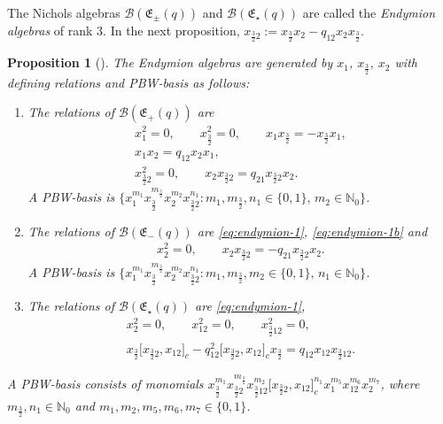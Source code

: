 \documentclass[10pt,a4paper]{amsart}
\numberwithin{equation}{section}
\newtheorem{Proposition}[Theorem]{Proposition}
 { \theoremstyle{definition}
\newtheorem{Definition}[Theorem]{Definition}
\newtheorem{Note}[Theorem]{Note}
\newtheorem{Example}[Theorem]{Example}
\newtheorem{Remark}[Theorem]{Remark} }
\newcommand{\toba}{\mathscr B}
\newcommand{\N}{{\mathbb N}}
\newcommand{\eny}{\mathfrak{E}}
\newcommand{\tresdos}{\frac{3}{2}}
\begin{document}
The Nichols algebras $\toba(\eny_{\pm}(q))$ and $\toba(\eny_{\star}(q))$ are called the \emph{Endymion algebras} of rank 3.
In the next proposition, $x_{\tresdos2} := x_{\tresdos}x_2 - q _{12} x_2x_{\tresdos}$.

\begin{Proposition}[{\cite[Propositions 8.1.6, 8.1.7 and 8.1.8]{AAH-triang}}]\label{prop:paleblocks}
The Endymion algebras are generated by $x_1$, $x_{\tresdos}$, $x_2$ with defining relations and PBW-basis as follows:
\begin{enumerate}[label=$(\alph*)$]\itemsep=0pt
\item The relations of $\toba(\eny_+(q))$ are
\begin{gather}\label{eq:endymion-1}
x_1^2=0, \qquad x_{\tresdos}^2=0,\qquad x_1x_{\tresdos} =- x_{\tresdos}x_1,
\\
\label{eq:endymion-1b}
x_1x_2 = q_{12} x_2x_1,
\\
\label{eq:endymion-2}
x_{\tresdos2}^2=0,\qquad
 x_2x_{\tresdos2} = q_{21}x_{\tresdos2} x_2.
\end{gather}
A PBW-basis is
$\big\{ x_1^{m_1} x_{\tresdos}^{m_{\tresdos}} x_2^{m_2}x_{\tresdos2}^{n_{1}}\colon m_1, m_{\tresdos}, n_1 \in \{0,1\}, \, m_2 \in\N_0\big\}$.

\item
The relations of $\toba(\eny_-(q))$ are \eqref{eq:endymion-1}, \eqref{eq:endymion-1b} and
\begin{gather}
\label{eq:endymion-2b}
x_2 ^2=0,\qquad
x_2 x_{\tresdos2} = -q_{21} x_{\tresdos2} x_2.
\end{gather}
A PBW-basis is
$\big\{ x_1^{m_1} x_{\tresdos}^{m_{\tresdos}} x_2^{m_2}x_{\tresdos2}^{n_{1}}\colon m_1, m_{\tresdos}, m_2 \in \{0,1\}, \, n_{1} \in\N_0\big\}$.

\item
The relations of $\toba(\eny_{\star}(q))$ are \eqref{eq:endymion-1},
\begin{gather*}%
x_2^2=0, \qquad x_{12}^2=0, \qquad x_{\tresdos12}^2=0,
\\
x_{\tresdos} \big[x_{\tresdos2},x_{12}\big]_c- q_{12}^2 \big[x_{\tresdos2},x_{12}\big]_c x_{\tresdos}
=q_{12} x_{12}x_{\tresdos12}.
\end{gather*}
\end{enumerate}

A PBW-basis consists of monomials
$x_{\tresdos}^{m_1}x_{\tresdos2}^{m_{\tresdos}} x_{\tresdos12}^{m_2} \big[x_{\tresdos2},x_{12}\big]_c^{n_{1}} x_1^{m_5}x_{12}^{m_6} x_2^{m_7}$,
where $m_{\tresdos}, n_{1} \in\N_0$ and $m_1, m_2, m_5, m_6, m_7 \in \{0,1\}$.
\end{Proposition}
\end{document}
